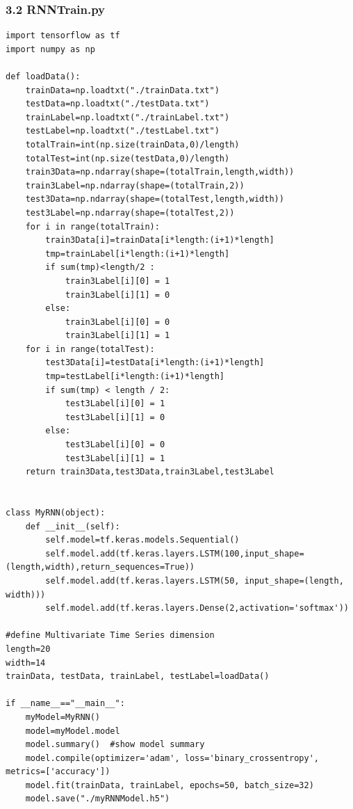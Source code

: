 \documentclass[12pt]{ctexart}
\begin{document}
\subsubsection*{3.2 RNNTrain.py}
\begin{scriptsize}
\begin{verbatim}
import tensorflow as tf
import numpy as np

def loadData():
    trainData=np.loadtxt("./trainData.txt")
    testData=np.loadtxt("./testData.txt")
    trainLabel=np.loadtxt("./trainLabel.txt")
    testLabel=np.loadtxt("./testLabel.txt")
    totalTrain=int(np.size(trainData,0)/length)
    totalTest=int(np.size(testData,0)/length)
    train3Data=np.ndarray(shape=(totalTrain,length,width))
    train3Label=np.ndarray(shape=(totalTrain,2))
    test3Data=np.ndarray(shape=(totalTest,length,width))
    test3Label=np.ndarray(shape=(totalTest,2))
    for i in range(totalTrain):
        train3Data[i]=trainData[i*length:(i+1)*length]
        tmp=trainLabel[i*length:(i+1)*length]
        if sum(tmp)<length/2 :
            train3Label[i][0] = 1
            train3Label[i][1] = 0
        else:
            train3Label[i][0] = 0
            train3Label[i][1] = 1
    for i in range(totalTest):
        test3Data[i]=testData[i*length:(i+1)*length]
        tmp=testLabel[i*length:(i+1)*length]
        if sum(tmp) < length / 2:
            test3Label[i][0] = 1
            test3Label[i][1] = 0
        else:
            test3Label[i][0] = 0
            test3Label[i][1] = 1
    return train3Data,test3Data,train3Label,test3Label


class MyRNN(object):
    def __init__(self):
        self.model=tf.keras.models.Sequential()
        self.model.add(tf.keras.layers.LSTM(100,input_shape=(length,width),return_sequences=True))
        self.model.add(tf.keras.layers.LSTM(50, input_shape=(length, width)))
        self.model.add(tf.keras.layers.Dense(2,activation='softmax'))

#define Multivariate Time Series dimension
length=20
width=14
trainData, testData, trainLabel, testLabel=loadData()

if __name__=="__main__":
    myModel=MyRNN()
    model=myModel.model
    model.summary()  #show model summary
    model.compile(optimizer='adam', loss='binary_crossentropy', metrics=['accuracy'])
    model.fit(trainData, trainLabel, epochs=50, batch_size=32)
    model.save("./myRNNModel.h5")

\end{verbatim}
\end{scriptsize}
\end{document}
